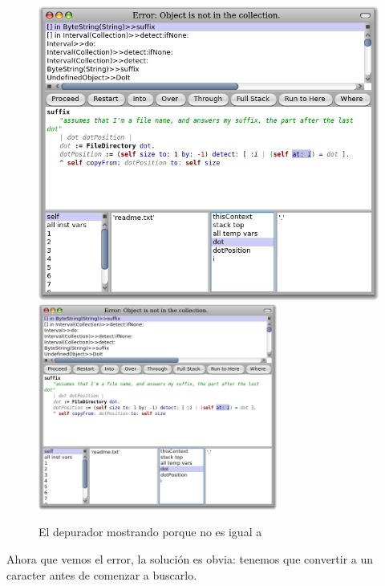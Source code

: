 \documentclass[spanish,a4paper,10pt,twoside]{book}
\begin{document}
\begin{figure}[btp]
	\begin{center}
	\ifluluelse
		{\includegraphics[width=\textwidth]{dotIsAString}}
		{\includegraphics[width=0.7\textwidth]{dotIsAString}}
	\end{center}
	\caption{El depurador mostrando porque  no es igual a }
\end{figure}

Ahora que vemos el error, la soluci\'on es obvia: tenemos que convertir  a un caracter antes de comenzar a buscarlo.
\end{document}
